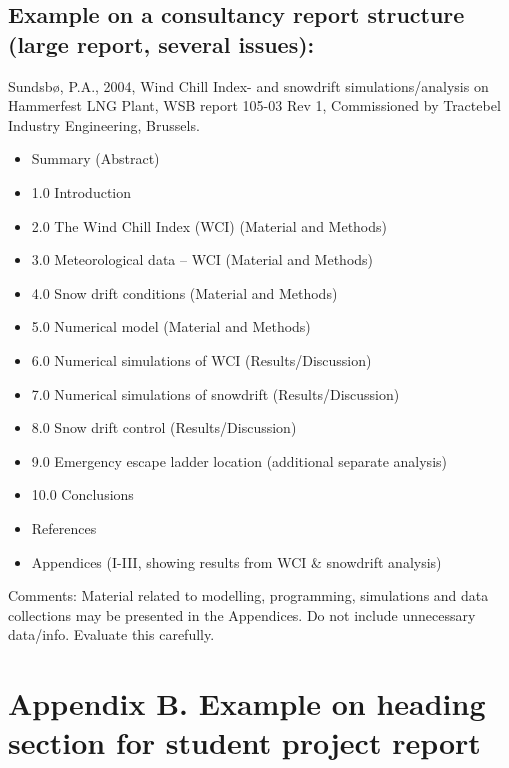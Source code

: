 \documentclass[a4paper,12pt]{extarticle}
\begin{document}
\subsection{Example on a consultancy report structure (large report, several issues):}
Sundsbø, P.A., 2004, Wind Chill Index- and snowdrift simulations/analysis on Hammerfest LNG Plant, WSB report 105-03 Rev 1, Commissioned by Tractebel Industry Engineering, Brussels.

\begin{itemize}
  \item Summary (Abstract)
  \item 1.0 Introduction
  \item 2.0 The Wind Chill Index (WCI) (Material and Methods)
  \item 3.0 Meteorological data – WCI (Material and Methods)
  \item 4.0 Snow drift conditions (Material and Methods)
  \item 5.0 Numerical model (Material and Methods)
  \item 6.0 Numerical simulations of WCI (Results/Discussion)
  \item 7.0 Numerical simulations of snowdrift (Results/Discussion)
  \item 8.0 Snow drift control (Results/Discussion)
  \item 9.0 Emergency escape ladder location (additional separate analysis)
  \item 10.0 Conclusions
  \item References
  \item Appendices (I-III, showing results from WCI \& snowdrift analysis)
\end{itemize}

Comments: Material related to modelling, programming, simulations and data collections may be presented in the Appendices. Do not include unnecessary data/info. Evaluate this carefully.

\pagebreak
\appendix
\section{Appendix B. Example on heading section for student project report}
\end{document}
